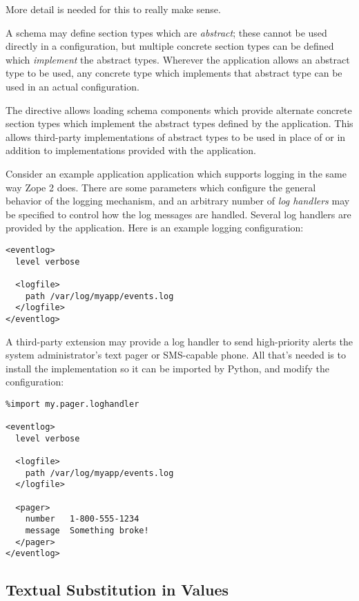 \documentclass{howto}
\begin{document}
More detail is needed for this to really make sense.

A schema may define section types which are \emph{abstract}; these
cannot be used directly in a configuration, but multiple concrete
section types can be defined which \emph{implement} the abstract
types.  Wherever the application allows an abstract type to be used,
any concrete type which implements that abstract type can be used in
an actual configuration.

The  directive allows loading schema components
which provide alternate concrete section types which implement the
abstract types defined by the application.  This allows third-party
implementations of abstract types to be used in place of or in
addition to implementations provided with the application.

Consider an example application application which supports logging in
the same way Zope 2 does.  There are some parameters which configure
the general behavior of the logging mechanism, and an arbitrary number
of \emph{log handlers} may be specified to control how the log
messages are handled.  Several log handlers are provided by the
application.  Here is an example logging configuration:

\begin{verbatim}
<eventlog>
  level verbose

  <logfile>
    path /var/log/myapp/events.log
  </logfile>
</eventlog>
\end{verbatim}

A third-party extension may provide a log handler to send
high-priority alerts the system administrator's text pager or
SMS-capable phone.  All that's needed is to install the implementation
so it can be imported by Python, and modify the configuration:

\begin{verbatim}
%import my.pager.loghandler

<eventlog>
  level verbose

  <logfile>
    path /var/log/myapp/events.log
  </logfile>

  <pager>
    number   1-800-555-1234
    message  Something broke!
  </pager>
</eventlog>
\end{verbatim}


\subsection{Textual Substitution in Values}
\end{document}
